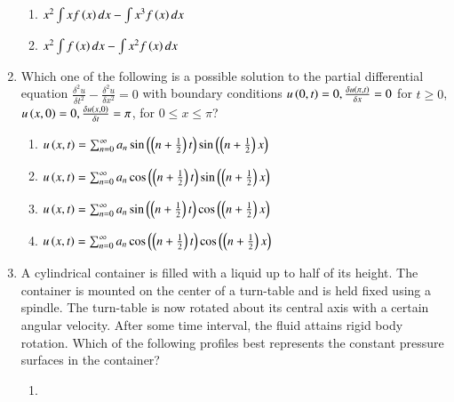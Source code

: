 \documentclass[journal]{IEEEtran}
\begin{document}
\begin{enumerate}
{\begin{multicols}{2}
\begin{enumerate}
\item $x^2\int xf\left(x\right)dx-\int x^3f\left(x\right)dx$
\item $x^2\int f\left(x\right)dx-\int x^2f\left(x\right)dx$
\end{enumerate}
\end{multicols}
}
\item{
Which one of the following is a possible solution to the partial differential equation $\frac{\delta^2u}{\delta t^2}-\frac{\delta^2u}{\delta x^2}=0$ with boundary conditions $u\left(0,t\right)=0,\frac{\delta u\left(\pi,t\right)}{\delta x}=0$ for $t\geq 0$,  $u\left(x,0\right)=0,\frac{\delta u\left(x,0\right)}{\delta t}=\pi$, for $0\leq x\leq \pi$?
\begin{enumerate}
\item $u\left(x,t\right)=\sum_{n=0}^\infty a_n\sin\left(\left(n+\frac{1}{2}\right)t\right)\sin\left(\left(n+\frac{1}{2}\right)x\right)$
\item $u\left(x,t\right)=\sum_{n=0}^\infty a_n\cos\left(\left(n+\frac{1}{2}\right)t\right)\sin\left(\left(n+\frac{1}{2}\right)x\right)$
\item $u\left(x,t\right)=\sum_{n=0}^\infty a_n\sin\left(\left(n+\frac{1}{2}\right)t\right)\cos\left(\left(n+\frac{1}{2}\right)x\right)$
\item $u\left(x,t\right)=\sum_{n=0}^\infty a_n\cos\left(\left(n+\frac{1}{2}\right)t\right)\cos\left(\left(n+\frac{1}{2}\right)x\right)$
\end{enumerate}
}
\item{
A cylindrical container is filled with a liquid up to half of its height. The container is mounted on the center of a turn-table and is held fixed using a spindle. The turn-table is now rotated about its central axis with a certain angular velocity. After some time interval, the fluid attains rigid body rotation. Which of the following profiles best represents the constant pressure surfaces in the container?
\begin{multicols}{2}
\begin{enumerate}
\item{\begin{figure}[H]
\centering
{}%


\end{figure}}
\end{enumerate}
\end{multicols}}
\end{enumerate}
\end{document}
